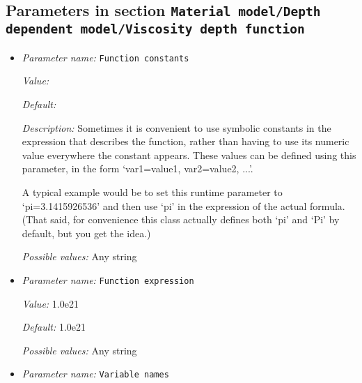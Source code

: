 \subsection{Parameters in section \tt Material model/Depth dependent model/Viscosity depth function}
\label{parameters:Material_20model/Depth_20dependent_20model/Viscosity_20depth_20function}

\begin{itemize}
\item {\it Parameter name:} {\tt Function constants}
\label{parameters:Material model/Depth dependent model/Viscosity depth function/Function constants}
\label{parameters:Material_20model/Depth_20dependent_20model/Viscosity_20depth_20function/Function_20constants}


{\it Value:} 


{\it Default:} 


{\it Description:} Sometimes it is convenient to use symbolic constants in the expression that describes the function, rather than having to use its numeric value everywhere the constant appears. These values can be defined using this parameter, in the form `var1=value1, var2=value2, ...'.

A typical example would be to set this runtime parameter to `pi=3.1415926536' and then use `pi' in the expression of the actual formula. (That said, for convenience this class actually defines both `pi' and `Pi' by default, but you get the idea.)


{\it Possible values:} Any string
\item {\it Parameter name:} {\tt Function expression}
\label{parameters:Material model/Depth dependent model/Viscosity depth function/Function expression}
\label{parameters:Material_20model/Depth_20dependent_20model/Viscosity_20depth_20function/Function_20expression}


{\it Value:} 1.0e21


{\it Default:} 1.0e21


{\it Possible values:} Any string
\item {\it Parameter name:} {\tt Variable names}
\label{parameters:Material model/Depth dependent model/Viscosity depth function/Variable names}
\label{parameters:Material_20model/Depth_20dependent_20model/Viscosity_20depth_20function/Variable_20names}



\end{itemize}
